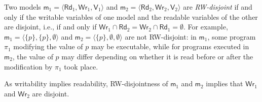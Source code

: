 \documentclass{llncs}
\newcommand{\modl}{\mathsf m}
\newcommand{\readset}{\mathsf{Rd}}
\newcommand{\valuset}{\mathsf{V}}
\newcommand{\writeset}{\mathsf{Wr}}
\newcommand{\set}[1]{\{#1\}}
\newcommand{\tuple}[1]{ \langle #1 \rangle}
\begin{document}
Two models 
$\modl_1 = \tuple{\readset_1,\writeset_1,\valuset_1}$ and 
$\modl_2 = \tuple{\readset_2,\writeset_2,\valuset_2}$ are \emph{RW-disjoint} 
if and only if the writable variables of one model and the readable variables of the other are disjoint, i.e., 
if and only if $\writeset_1 \cap \readset_2  = \writeset_2 \cap \readset_1  = \emptyset $. 
For example, 
$\modl_1 = \tuple{ \set p , \set p , \emptyset}$ and 
$\modl_2 = \tuple{ \set p , \emptyset , \emptyset}$ are not RW-disjoint:
in $\modl_1$, some program $\pi_1$ modifying the value of $p$ may be executable, while 
for programs executed in $\modl_2$, the value of $p$ %
may differ depending on whether it is read 
before or after the modification by $\pi_1$ took place. 

As writability implies readability, %
RW-disjointness of $\modl_1$ and $\modl_2$ implies that
$\writeset_1$ and $\writeset_2$ are disjoint. 
\end{document}
